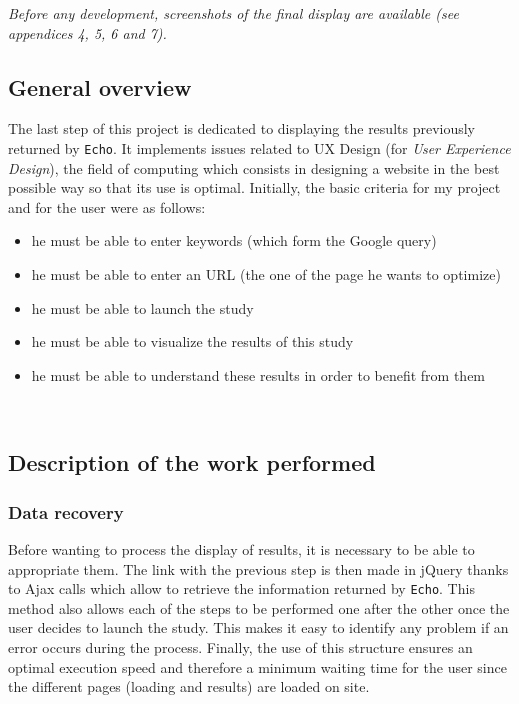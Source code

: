 \documentclass[12pt]{article}
\begin{document}
\textit{Before any development, screenshots of the final display are available (see \textsl{appendices 4, 5, 6 and 7}).}

\subsection{General overview}

The last step of this project is dedicated to displaying the results previously returned by \texttt{Echo}. It implements issues related to UX Design (for \textit{User Experience Design}), the field of computing which consists in designing a website in the best possible way so that its use is optimal. Initially, the basic criteria for my project and for the user were as follows: 
\begin{itemize}
	\item he must be able to enter keywords (which form the Google query)
	\item he must be able to enter an URL (the one of the page he wants to optimize)
	\item he must be able to launch the study
	\item he must be able to visualize the results of this study
	\item he must be able to understand these results in order to benefit from them
\end{itemize}

\

\subsection{Description of the work performed}

\subsubsection{Data recovery}

Before wanting to process the display of results, it is necessary to be able to appropriate them. The link with the previous step is then made in \textsf{jQuery} thanks to \textsf{Ajax} calls which allow to retrieve the information returned by \texttt{Echo}. This method also allows each of the steps to be performed one after the other once the user decides to launch the study. This makes it easy to identify any problem if an error occurs during the process. Finally, the use of this structure ensures an optimal execution speed and therefore a minimum waiting time for the user since the different pages (loading and results) are loaded on site. 
\end{document}
